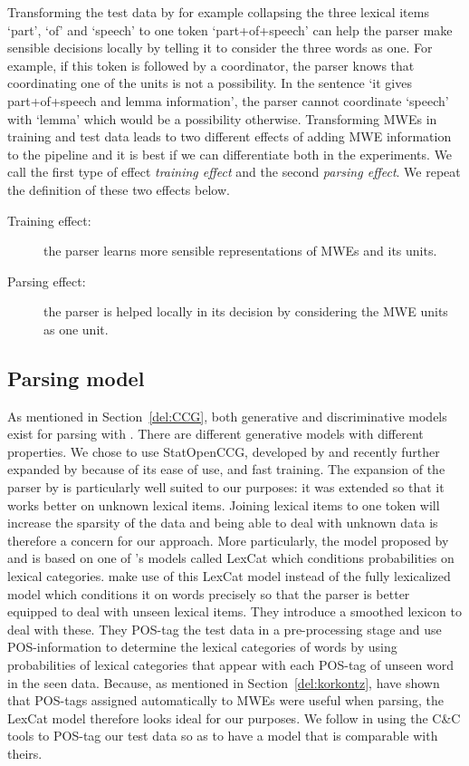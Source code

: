 \documentclass[output=paper]{langsci/langscibook}
\begin{document}
\indent Transforming the test data by for example collapsing the three lexical items `part', `of' and `speech' to one token `part+of+speech' can help the parser make sensible decisions locally by telling it to consider the three words as one. For example, if this token is followed by a coordinator, the parser knows that coordinating one of the units is not a possibility. In the sentence `it gives part+of+speech and lemma information', the parser cannot coordinate `speech' with `lemma' which would be a possibility otherwise. Transforming MWEs in training and test data leads to two different effects of adding MWE information to the  pipeline and it is best if we can differentiate both in the experiments. We call the first type of effect \textit{training effect} and the second \textit{parsing effect}. We repeat the definition of these two effects below.
    \begin{description}
        \item[Training effect:] the parser learns more sensible representations of MWEs and its units. 
        \item[Parsing effect:] the parser is helped locally in its decision by considering the MWE units as one unit.
    \end{description}

\subsection{Parsing model}
\label{del:parsingmodel}
\indent As mentioned in Section~\ref{del:CCG}, both generative and discriminative models exist for parsing with . There are different generative models with different properties. We chose to use StatOpenCCG, developed by \citet{christodoulopoulos2008} and recently further expanded by \citet{deoskar} because of its ease of use,  and fast training. The expansion of the parser by \citet{deoskar} is particularly well suited to our purposes: it was extended so that it works better on unknown lexical items. Joining lexical items to one token will increase the sparsity of the data and being able to deal with unknown data is therefore a concern for our approach. More particularly, the model proposed by \citet{christodoulopoulos2008} and \citet{deoskar} is based on one of \citet{hockenmaier2003}'s models called LexCat which conditions probabilities on lexical categories. \citet{deoskar} make use of this LexCat model instead of the fully lexicalized model which conditions it on words precisely so that the parser is better equipped to deal with unseen lexical items. They introduce a smoothed lexicon to deal with these. They POS-tag the test data in a pre-processing stage and use POS-information to determine the lexical categories of words by using probabilities of lexical categories that appear with each POS-tag of unseen word in the seen data. Because, as mentioned in Section~\ref{del:korkontz}, \citet{korkontzelosetal2010} have shown that POS-tags assigned automatically to MWEs were useful when parsing, the LexCat model therefore looks ideal for our purposes. We follow \citet{deoskar} in using the C\&C tools \citep{cctools} to POS-tag our test data so as to have a model that is comparable with theirs.
\end{document}
